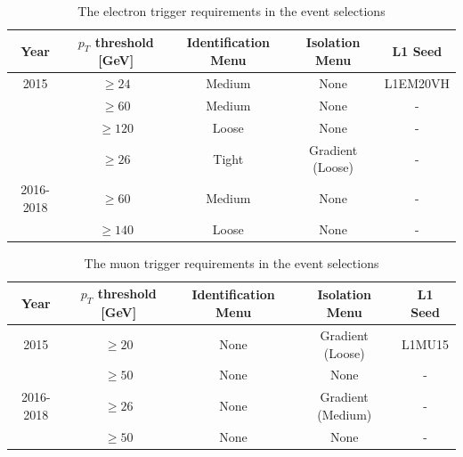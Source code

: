\begin{table}[]
\small
\begin{center}
{\renewcommand{\arraystretch}{1.2}
\begin{tabular}{c|c|c|c|c}
\hline
Year  &  $p_T$ threshold [GeV]   & Identification Menu & Isolation Menu & L1 Seed  \\  \hline 
2015   &    $\geq 24  $ &  Medium  &  None	& L1EM20VH	\\
           &   $\geq 60   $ &   Medium  &  None	&  -	\\  
            &  $\geq 120 $ &   Loose  &    None		& -	\\ \hline 
  &   $\geq 26   $ &  Tight  &   Gradient (Loose) 	&  -	\\
2016-2018  &   $\geq 60   $ &   Medium  &  None	&  -	\\  
 &  $\geq 140 $ &   Loose  &  None	&  -	 \\ \hline     
\end{tabular}
\caption{The electron trigger requirements in the event selections}
\label{tab:ElectronTrigs}
}
\end{center}
\end{table}

\begin{table}[]
\small
\begin{center}
{\renewcommand{\arraystretch}{1.2}
\begin{tabular}{c|c|c|c|c}
\hline
Year  &  $p_T$ threshold [GeV]   & Identification Menu & Isolation Menu & L1 Seed  \\  \hline 
2015   &    $\geq 20  $ & None  &  Gradient (Loose)	& L1MU15 \\
           &   $\geq 50   $ &   None  &  None	&  -	\\   \hline 
2016-2018  &   $\geq 26   $ &  None  &   Gradient (Medium) 	&  -	\\
  &   $\geq 50   $ &   None  &  None	&  -	\\ \hline   
\end{tabular}
\caption{The muon trigger requirements in the event selections}
\label{tab:MuonTrigs}
}
\end{center}
\end{table}



